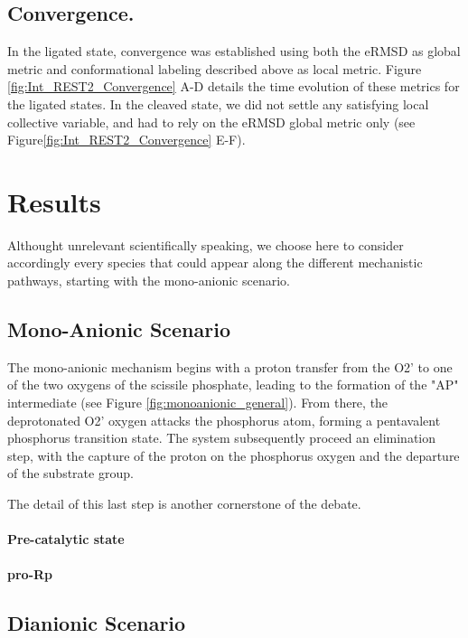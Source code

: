 \documentclass[journal=jacsat,manuscript=article]{achemso}
\begin{document}
\subsection{Convergence.}
In the ligated state, convergence was established using both the eRMSD as global metric
 and conformational labeling described above as local metric.
Figure \ref{fig:Int_REST2_Convergence} A-D details the time evolution of these metrics for the ligated states.
In the cleaved state, we did not settle any satisfying local collective variable, and had to rely on the eRMSD global metric only 
(see Figure\ref{fig:Int_REST2_Convergence} E-F).



\section{Results}

Althought unrelevant scientifically speaking, 
we choose here to consider accordingly every species that could appear along the different mechanistic pathways, 
starting with the mono-anionic scenario. 

\subsection{Mono-Anionic Scenario}

The mono-anionic mechanism begins with a proton transfer from the O2' to one of the two oxygens of the scissile phosphate,
leading to the formation of the "AP" intermediate (see Figure \ref{fig:monoanionic_general}).
From there, the deprotonated O2' oxygen attacks the phosphorus atom, forming a pentavalent phosphorus transition state.
The system subsequently proceed an elimination step, with the capture of the proton on the phosphorus oxygen and the departure of the substrate group.


The detail of this last step is another cornerstone of the debate. 


\paragraph{Pre-catalytic state}

\paragraph{pro-Rp }


\subsection{Dianionic Scenario}
\end{document}
